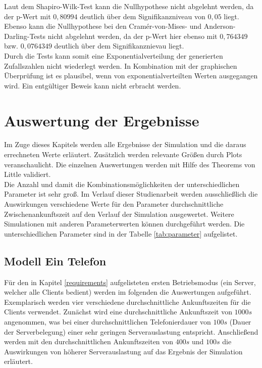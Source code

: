 Laut dem Shapiro-Wilk-Test kann die Nullhypothese nicht abgelehnt werden, da der p-Wert mit $0,80994$ deutlich über dem Signifikanzniveau von $0,05$ liegt. Ebenso kann die Nullhypothese bei den Cramér-von-Mises- und Anderson-Darling-Tests nicht abgelehnt werden, da der p-Wert hier ebenso mit $0,764349$ bzw. $0,0764349$ deutlich über dem Signifikanznievau liegt.\\
Durch die Tests kann somit eine Exponentialverteilung der generierten Zufallszahlen nicht wiederlegt werden. In Kombination mit der graphischen Überprüfung ist es plausibel, wenn von exponentialverteilten Werten ausgegangen wird. Ein entgültiger Beweis kann nicht erbracht werden.

\section{Auswertung der Ergebnisse}
Im Zuge dieses Kapitels werden alle Ergebnisse der Simulation und die daraus errechneten Werte erläutert. Zusätzlich werden relevante Größen durch Plots veranschaulicht. Die einzelnen Auswertungen werden mit Hilfe des Theorems von Little validiert.\\
Die Anzahl und damit die Kombinationsmöglichkeiten der unterschiedlichen Parameter ist sehr groß. Im Verlauf dieser Studienarbeit werden ausschließlich die Auswirkungen verschiedene Werte für den Parameter durchschnittliche Zwischenankunftszeit auf den Verlauf der Simulation ausgewertet. Weitere Simulationen mit anderen Parameterwerten können durchgeführt werden. Die unterschiedlichen Parameter sind in der Tabelle \ref{tab:parameter} aufgelistet.


\subsection{Modell \glqq Ein Telefon\grqq}
Für den in Kapitel \ref{requirements} aufgelisteten ersten Betriebsmodus (ein Server, welcher alle Clients bedient) werden im folgenden die Auswertungen aufgeführt. Exemplarisch werden vier verschiedene durchschnittliche Ankunftszeiten für die Clients verwendet. Zunächst wird eine durchschnittliche Ankunftszeit von $1000s$ angenommen, was bei einer durchschnittlichen Telefonierdauer von $100s$ (Dauer der Serverbelegung) einer sehr geringen Serverauslastung entspricht. Anschließend werden mit den durchschnittlichen Ankunftszeiten von $400s$ und $100s$ die Auswirkungen von höherer Serverauslastung auf das Ergebnis der Simulation erläutert. \\

